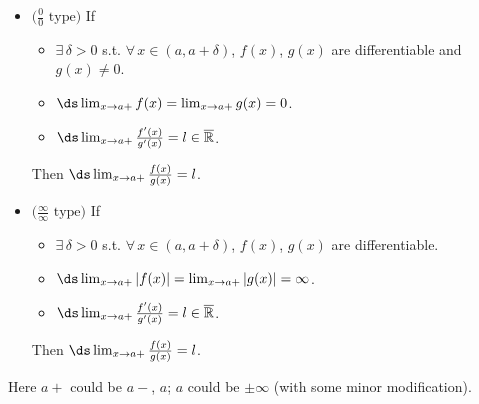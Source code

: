 \begin{theorem}
  \begin{itemize}
    \item $\big(\frac{0}{0}\text{ type}\big)$ If
      \begin{itemize}
        \item $\exists\,\delta > 0$ s.t. $\forall\,x\in(a, a + \delta)$, $f(x)$, $g(x)$ are differentiable and $g(x)\ne 0$.
        \item $\ds\lim_{x\to a+}f(x) = \lim_{x\to a+}g(x) = 0$.
        \item $\ds\lim_{x\to a+}\frac{f'(x)}{g'(x)} = l\in\overline{\mathbb{R}}$.
      \end{itemize}
      Then $\ds\lim_{x\to a+}\frac{f(x)}{g(x)} = l$.
    \item $\big(\frac{\infty}{\infty}\text{ type}\big)$ If
      \begin{itemize}
        \item $\exists\,\delta > 0$ s.t. $\forall\,x\in(a, a + \delta)$, $f(x)$, $g(x)$ are differentiable.
        \item $\ds\lim_{x\to a+}|f(x)| = \lim_{x\to a+}|g(x)| = \infty$.
        \item $\ds\lim_{x\to a+}\frac{f'(x)}{g'(x)} = l\in\overline{\mathbb{R}}$.
      \end{itemize}
      Then $\ds\lim_{x\to a+}\frac{f(x)}{g(x)} = l$.
  \end{itemize}
  Here $a+$ could be $a-$, $a$; $a$ could be $\pm\infty$ (with some minor modification).
\end{theorem}

